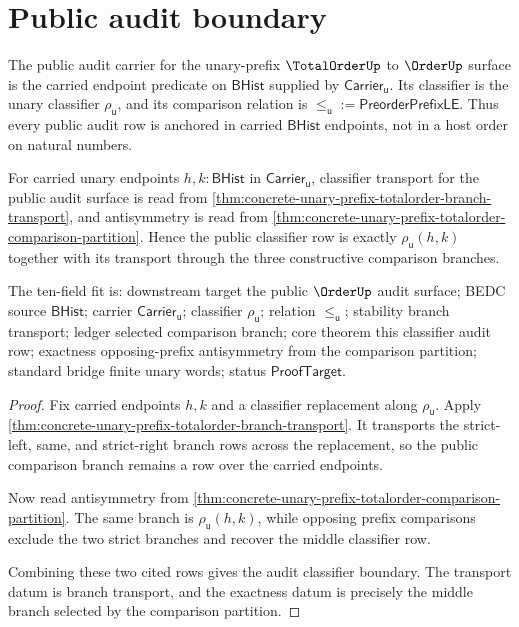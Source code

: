 \section{Public audit boundary}
\label{sec:totalorder-orderup-public-audit-boundary}

\begin{definition}
\label{def:totalorder-orderup-public-audit-carrier}
The public audit carrier for the unary-prefix $\TotalOrderUp$ to $\OrderUp$
surface is the carried endpoint predicate on $\mathsf{BHist}$ supplied by
$\mathsf{Carrier}_{\mathsf{u}}$. Its classifier is the unary classifier
$\rho_{\mathsf{u}}$, and its comparison relation is
$\le_{\mathsf{u}} := \mathsf{PreorderPrefixLE}$. Thus every public audit row is
anchored in carried $\mathsf{BHist}$ endpoints, not in a host order on natural
numbers.
\end{definition}

\begin{theorem}
\label{thm:totalorder-orderup-public-audit-classifier}
For carried unary endpoints $h,k:\mathsf{BHist}$ in
$\mathsf{Carrier}_{\mathsf{u}}$, classifier transport for the public audit
surface is read from
\autoref{thm:concrete-unary-prefix-totalorder-branch-transport}, and
antisymmetry is read from
\autoref{thm:concrete-unary-prefix-totalorder-comparison-partition}. Hence the
public classifier row is exactly $\rho_{\mathsf{u}}(h,k)$ together with its
transport through the three constructive comparison branches.

The ten-field fit is: downstream target the public $\OrderUp$ audit surface;
BEDC source $\mathsf{BHist}$; carrier $\mathsf{Carrier}_{\mathsf{u}}$;
classifier $\rho_{\mathsf{u}}$; relation $\le_{\mathsf{u}}$; stability branch
transport; ledger selected comparison branch; core theorem this classifier
audit row; exactness opposing-prefix antisymmetry from the comparison
partition; standard bridge finite unary words; status $\mathsf{ProofTarget}$.
\end{theorem}
\begin{proof}
Fix carried endpoints $h,k$ and a classifier replacement along
$\rho_{\mathsf{u}}$. Apply
\autoref{thm:concrete-unary-prefix-totalorder-branch-transport}. It transports
the strict-left, same, and strict-right branch rows across the replacement,
so the public comparison branch remains a row over the carried endpoints.

Now read antisymmetry from
\autoref{thm:concrete-unary-prefix-totalorder-comparison-partition}. The same
branch is $\rho_{\mathsf{u}}(h,k)$, while opposing prefix comparisons exclude
the two strict branches and recover the middle classifier row.

Combining these two cited rows gives the audit classifier boundary. The
transport datum is branch transport, and the exactness datum is precisely the
middle branch selected by the comparison partition.
\end{proof}

